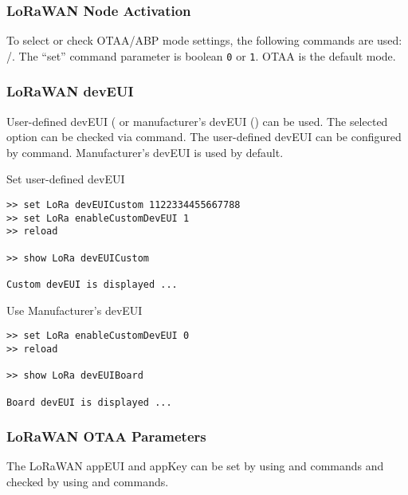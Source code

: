 \subsubsection{LoRaWAN Node Activation}
To select or check OTAA/ABP mode settings, the following commands are used: /. The “set” command parameter is boolean {\tt 0} or {\tt 1}. OTAA is the default mode.

\subsubsection{LoRaWAN devEUI}
User-defined devEUI ( or manufacturer's devEUI () can be used. The selected option can be checked via  command. The user-defined devEUI can be configured by  command. Manufacturer's devEUI is used by default.

\clearpage

\begin{docCodeExampleTitled}{Set user-defined devEUI}
\begin{verbatim}
>> set LoRa devEUICustom 1122334455667788
>> set LoRa enableCustomDevEUI 1
>> reload

>> show LoRa devEUICustom

Custom devEUI is displayed ...
\end{verbatim}
\end{docCodeExampleTitled}

\begin{docCodeExampleTitled}{Use Manufacturer's devEUI}
\begin{verbatim}
>> set LoRa enableCustomDevEUI 0
>> reload

>> show LoRa devEUIBoard

Board devEUI is displayed ...
\end{verbatim}
\end{docCodeExampleTitled}

\subsubsection{LoRaWAN OTAA Parameters}
The LoRaWAN appEUI and appKey can be set by using  and  commands and checked by using  and  commands.
  
